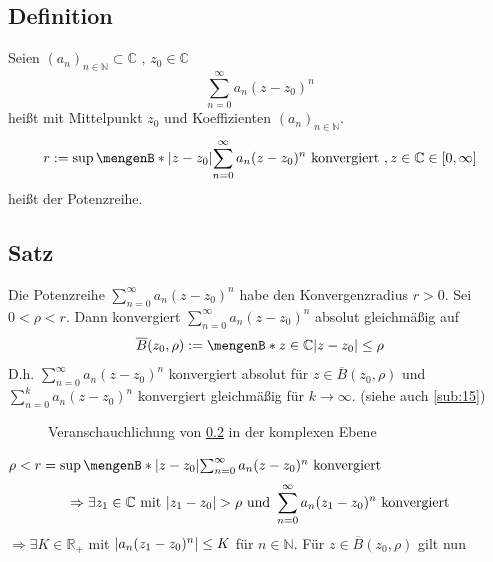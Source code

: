 \subsection[Definition Potenzreihe und Konvergenzradius]{Definition} %
\label{sub:19}
Seien $(a_n)_{n \in \mathds{N} } \subset \mathds{C}$ , $z_0 \in \mathds{C}$
\[
	\sum_{n=0}^{\infty} a_n (z-z_0)^n 
\]
heißt  mit Mittelpunkt $z_0$ und Koeffizienten $(a_n)_{n \in \mathds{N}}$.
\[
	r := \sup \set[\abs{z -z_0} ]{ \sum_{n=0}^{\infty} a_n (z-z_0)^n \text{ konvergiert } , z \in \mathds{C} } \in [0, \infty]
\]
heißt  der Potenzreihe.

\subsection[Satz über absolute gleichmäßige Konvergenz innerhalb des Konvergenzradius]{Satz} %
\label{sub:110}
Die Potenzreihe $\sum_{n=0}^{\infty} a_n (z-z_0)^n$ habe den Konvergenzradius $r>0$. Sei $0 < \rho < r$. Dann konvergiert $\sum_{n=0}^{\infty} a_n (z -z_0)^n$ absolut
gleichmäßig auf 
\[
	\overline{B}(z_0, \rho) := \set[z \in \mathds{C}]{\abs{z-z_0} \le \rho }  
\]
D.h. $\sum_{n=0}^{\infty} a_n (z-z_0)^n $ konvergiert absolut für $z \in \overline{B}(z_0, \rho) $ und $\sum_{n=0}^{k} a_n (z-z_0 )^n$ konvergiert gleichmäßig für
$k \to \infty$. {\footnotesize (siehe auch \ref{sub:15})}
\begin{figure}[ht]
	\caption{Veranschauchlichung von \ref{sub:110} in der komplexen Ebene}
\end{figure}
$\rho < r = \sup \set[\abs{z -z_0} ]{ \sum_{n=0}^{\infty} a_n (z-z_0)^n \text{ konvergiert}}$ 
\[
	\Rightarrow \exists z_1 \in \mathbb{C} \text{ mit } \lvert z_1 -z_0\rvert > \rho \text{ und } \sum_{n=0}^{\infty} a_n (z_1 -z_0)^n \text{ konvergiert} 
\]
$\Rightarrow \exists K \in \mathds{R}_+$ mit $\lvert a_n (z_1 -z _0)^n\rvert\le  K$ für $n \in \mathds{N} $. Für $z \in \overline{B}(z_0, \rho) $ gilt nun 
